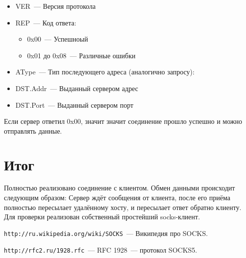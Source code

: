 \documentclass[a4paper,11pt]{article}
\begin{document}
\begin{itemize}

  \item VER~--- Версия протокола

  \item REP~--- Код ответа: 

  \begin{itemize}
    
    \item 0x00~--- Успешноый

    \item 0x01 до 0x08~--- Различные ошибки

  \end{itemize}

  \item AType~--- Тип последующего адреса (аналогично запросу):

  \item DST.Addr~--- Выданный сервером адрес

  \item DST.Port~--- Выданный сервером порт

\end{itemize}

Если сервер ответил 0x00, значит значит соединение прошло успешно и можно отправлять данные.

\section{Итог}

Полностью реализовано соединение с клиентом. Обмен данными происходит следующим образом: Сервер ждёт сообщения от клиента, после его приёма полностью пересылает удалённому хосту, и пересылает ответ обратно клиенту. Для проверки реализован собственный простейший socks-клиент.

\begin{thebibliography}{text} 

 \label{bib_1} \verb+http://ru.wikipedia.org/wiki/SOCKS+~--- Википедия про SOCKS.

 \label{bib_2} \verb+http://rfc2.ru/1928.rfc+~--- RFC 1928~--- протокол SOCKS5. 
	
\end{thebibliography} 
\end{document}
